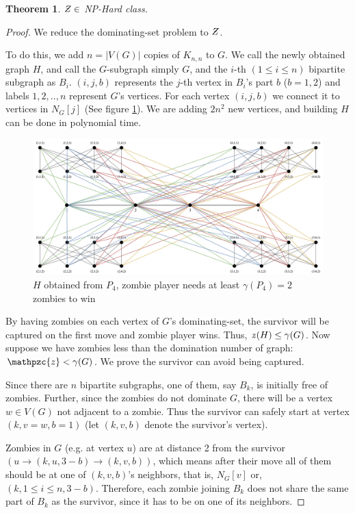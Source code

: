 \documentclass[1p]{elsarticle}
\newtheorem{theorem}{Theorem}
\newcommand{\NPZ}{\ooalign{$Z$\cr\hfil\rule[.8ex]{.3em}{.09ex}\hfil\cr}}
\newcommand{\zn}{\ooalign{$z$\cr\hfil\rule[.5ex]{.2em}{.08ex}\hfil\cr}}
\begin{document}
	\begin{theorem}
		$\NPZ \in$ NP-Hard class.
	\end{theorem}
	\begin{proof}
		We reduce the dominating-set problem to $\NPZ$.

		To do this, we add $n = |V(G)|$ copies of $K_{n,n}$ to $G$. We call the newly obtained graph $H$, and call the
		$G$-subgraph simply $G$, and the $i$-th $(1 \leq i \leq n)$ bipartite subgraph as $B_i$. $(i,j,b)$ represents
		the $j$-th vertex in $B_i$'s part $b$ ($b = 1,2$) and labels $1,2,..,n$ represent $G$'s vertices. For each
		vertex $(i,j,b)$ we connect it to vertices in $N_G[j]$ (See figure \ref{fig:p8}). We are adding $2n^2$ new
		vertices, and building $H$ can be done in polynomial time.

		\begin{figure}[h!]
			\centering
			\includegraphics[width=0.9\linewidth]{sec5.png}
			\caption{$H$ obtained from $P_4$, zombie player needs at least $\gamma(P_4) = 2$ zombies to win}
			\label{fig:p8}
		\end{figure}

		By having zombies on each vertex of $G$'s dominating-set, the survivor will be captured on the first move and zombie
		player wins. Thus, $\zn(H) \leq \gamma(G)$. Now suppose we have zombies less than the domination number of
		graph: $\mathpzc{z} < \gamma(G)$. We prove the survivor can avoid being captured.
		
		Since there are $n$ bipartite subgraphs, one of them, say $B_k$, is initially free of zombies. Further, since
		the zombies do not dominate $G$, there will be a vertex $w \in V (G)$ not adjacent to a zombie. Thus the
		survivor can safely start at vertex $(k,v = w,b = 1)$ (let $(k,v,b)$ denote the survivor's vertex).

		Zombies in $G$ (e.g. at vertex $u$) are at distance 2 from the survivor $(u \rightarrow (k,u,3 - b) \rightarrow
		(k,v,b))$, which means after their move all of them should be at one of $(k,v,b)$'s neighbors, that is, $N_G[v]
		$ or, $ (k,1 \leq i \leq n,3 - b)$. Therefore, each zombie joining $B_k$ does not share the same part of
		$B_k$ as the survivor, since it has to be on one of its neighbors.
		

\end{proof}
\end{document}
